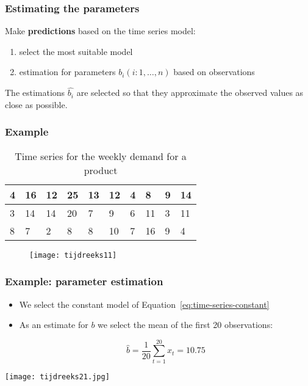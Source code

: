 \documentclass[aspectratio=169]{beamer}
\begin{document}
\begin{frame}
  \frametitle{Estimating the parameters}
  
  Make \textbf{predictions} based on the time series model:
  
  \begin{enumerate}
    \item select the most suitable model
    \item estimation for parameters $b_i (i: 1, \dots, n)$ based on observations
  \end{enumerate}
  
  The estimations $\widehat{b_i}$ are selected so that they approximate the observed values as close as possible.
\end{frame}

\begin{frame}
  \frametitle{Example}
  
  \begin{table}[t]
    \centering
    \begin{tabular}{|l|l|l|l|l|l|l|l|l|l|}
      \hline
      4 & 16 & 12 & 25 & 13 & 12 & 4 & 8  & 9 & 14 \\ \hline
      3 & 14 & 14 & 20 & 7  & 9  & 6 & 11 & 3 & 11 \\ \hline
      8 & 7  & 2  & 8  & 8  & 10 & 7 & 16 & 9 & 4  \\ \hline
    \end{tabular}
    \label{tab:data}
    \caption{Time series for the weekly demand for a product}
  \end{table}
  
  \begin{figure}
    \centering
    \texttt{[image: tijdreeks11]}
  \end{figure}
\end{frame}

\begin{frame}
  \frametitle{Example: parameter estimation}
  
  \begin{itemize}
    \item We select the constant model of Equation~\ref{eq:time-series-constant}
    \item As an estimate for $b$ we select the mean of the first 20 observations:
    
    \[ \widehat{b} = \frac{1}{20} \sum_{t = 1}^{20} x_{t}= 10.75 \]
    
  \end{itemize}
  
  \centering
  \texttt{[image: tijdreeks21.jpg]}
\end{frame}
\end{document}
